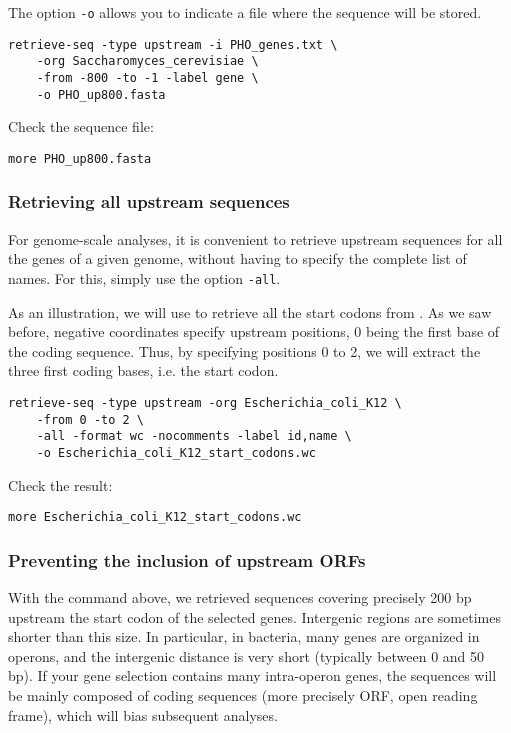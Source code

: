 The option \texttt{-o} allows you to indicate a file where the
sequence will be stored.

\begin{verbatim}
retrieve-seq -type upstream -i PHO_genes.txt \
    -org Saccharomyces_cerevisiae \
    -from -800 -to -1 -label gene \
    -o PHO_up800.fasta
\end{verbatim} 

Check the sequence file:

\begin{verbatim}
more PHO_up800.fasta
\end{verbatim}

\subsubsection{Retrieving all upstream sequences}

For genome-scale analyses, it is convenient to retrieve upstream
sequences for all the genes of a given genome, without having to
specify the complete list of names. For this, simply use the option
\texttt{-all}.

As an illustration, we will use \command{retrieve-seq} to retrieve all
the start codons from . As we saw before,
negative coordinates specify upstream positions, 0 being the first
base of the coding sequence. Thus, by specifying positions 0 to 2, we
will extract the three first coding bases, i.e. the start codon. 

\begin{verbatim}
retrieve-seq -type upstream -org Escherichia_coli_K12 \
    -from 0 -to 2 \
    -all -format wc -nocomments -label id,name \
    -o Escherichia_coli_K12_start_codons.wc
\end{verbatim}

Check the result:

\begin{verbatim}
more Escherichia_coli_K12_start_codons.wc
\end{verbatim}

\subsubsection{Preventing the inclusion of upstream ORFs}

With the command above, we retrieved sequences covering precisely 200
bp upstream the start codon of the selected genes. Intergenic regions
are sometimes shorter than this size. In particular, in bacteria, many
genes are organized in operons, and the intergenic distance is very
short (typically between 0 and 50 bp). If your gene selection contains
many intra-operon genes, the sequences will be mainly composed of
coding sequences (more precisely ORF, open reading frame), which will
bias subsequent analyses.

